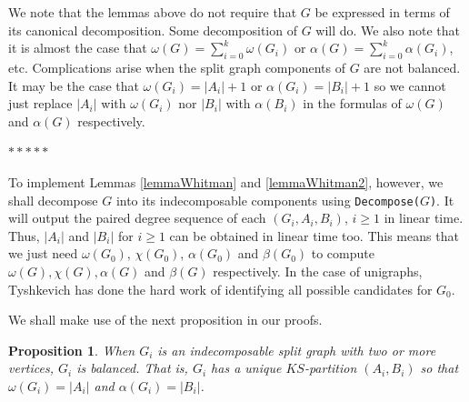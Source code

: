 \documentclass[11pt]{article}
\newtheorem{proposition}[df]{Proposition}
\begin{document}
We note that the lemmas above do not require that $G$ be expressed in terms of its canonical decomposition.  Some decomposition of $G$ will do.   We also note that it is almost the case that $\omega(G) = \sum_{i=0}^k \omega (G_i)$ or $\alpha(G) = \sum_{i=0}^k \alpha(G_i)$, etc.   Complications arise when the split graph components of $G$ are not balanced.  It may be the case that $\omega(G_i) = |A_i|+1$ or $\alpha(G_i) = |B_i| + 1$ so we cannot just replace $|A_i|$ with $\omega(G_i)$  nor $|B_i|$ with $\alpha(B_i)$ in the formulas of $\omega(G)$ and $\alpha(G)$ respectively.  



\medskip	
\bigskip %
\centerline{$*  *  *  * *$}
\bigskip %
\medskip




To implement Lemmas \ref{lemmaWhitman} and \ref{lemmaWhitman2}, however, we shall decompose $G$ into its indecomposable components using {\tt Decompose($G$)}.  
It will output the paired degree sequence of each $(G_i, A_i, B_i)$, $i \ge 1$ in linear time.  Thus,   $|A_i|$ and $|B_i|$  for $i \ge 1$ can be obtained in linear time too.  This means that we just need $\omega(G_0)$, $\chi(G_0)$, $\alpha(G_0)$ and $\beta(G_0)$ to compute $\omega(G), \chi(G), \alpha(G)$ and $\beta(G)$ respectively.   In the case of unigraphs,  Tyshkevich has done the hard work of identifying all possible candidates for $G_0$.  

We shall make use of the next proposition in our proofs. 

  \begin{proposition} 
 When $G_i$ is an indecomposable split graph with two or more vertices, $G_i$ is balanced. That is, $G_i$ has a unique $KS$-partition $(A_i,B_i)$ so that $\omega(G_i) = |A_i|$ and $\alpha(G_i) = |B_i|$. 
 \label{indecomsplit}
  \end{proposition}







\end{document}
